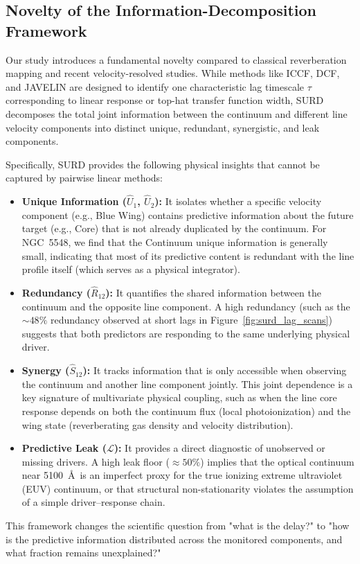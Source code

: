 \documentclass[fleqn,usenatbib]{mnras}
\begin{document}
\subsection{Novelty of the Information-Decomposition Framework}
\label{sec:novelty_framework}

Our study introduces a fundamental novelty compared to classical reverberation mapping and recent velocity-resolved studies. While methods like ICCF, DCF, and JAVELIN are designed to identify one characteristic lag timescale $\tau$ corresponding to linear response or top-hat transfer function width, SURD decomposes the total joint information between the continuum and different line velocity components into distinct unique, redundant, synergistic, and leak components.

Specifically, SURD provides the following physical insights that cannot be captured by pairwise linear methods:
\begin{itemize}
    \item \textbf{Unique Information ($\widehat{U}_1$, $\widehat{U}_2$):} It isolates whether a specific velocity component (e.g., Blue Wing) contains predictive information about the future target (e.g., Core) that is not already duplicated by the continuum. For NGC~5548, we find that the Continuum unique information is generally small, indicating that most of its predictive content is redundant with the line profile itself (which serves as a physical integrator).
    \item \textbf{Redundancy ($\widehat{R}_{12}$):} It quantifies the shared information between the continuum and the opposite line component. A high redundancy (such as the $\sim 48\%$ redundancy observed at short lags in Figure~\ref{fig:surd_lag_scans}) suggests that both predictors are responding to the same underlying physical driver.
    \item \textbf{Synergy ($\widehat{S}_{12}$):} It tracks information that is only accessible when observing the continuum and another line component jointly. This joint dependence is a key signature of multivariate physical coupling, such as when the line core response depends on both the continuum flux (local photoionization) and the wing state (reverberating gas density and velocity distribution).
    \item \textbf{Predictive Leak ($\mathcal{L}$):} It provides a direct diagnostic of unobserved or missing drivers. A high leak floor ($\approx 50\%$) implies that the optical continuum near 5100~\AA\ is an imperfect proxy for the true ionizing extreme ultraviolet (EUV) continuum, or that structural non-stationarity violates the assumption of a simple driver--response chain.
\end{itemize}
This framework changes the scientific question from "what is the delay?" to "how is the predictive information distributed across the monitored components, and what fraction remains unexplained?"
\end{document}
